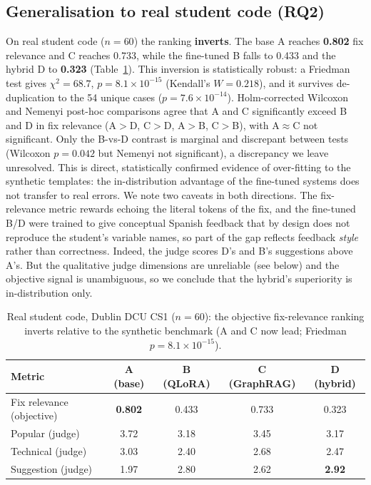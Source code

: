 \documentclass[sageh]{sagej}
\begin{document}
\subsection{Generalisation to real student code (RQ2)}
On real student code ($n=60$) the ranking \textbf{inverts}. The base A reaches \textbf{0.802} fix relevance and C reaches 0.733, while the fine-tuned B falls to 0.433 and the hybrid D to \textbf{0.323} (Table~\ref{tab:dublin}). This inversion is statistically robust: a Friedman test gives $\chi^2=68.7$, $p=8.1\times10^{-15}$ (Kendall's $W=0.218$), and it survives de-duplication to the 54 unique cases ($p=7.6\times10^{-14}$). Holm-corrected Wilcoxon and Nemenyi post-hoc comparisons agree that A and C significantly exceed B and D in fix relevance (A$>$D, C$>$D, A$>$B, C$>$B), with A$\approx$C not significant. Only the B-vs-D contrast is marginal and discrepant between tests (Wilcoxon $p=0.042$ but Nemenyi not significant), a discrepancy we leave unresolved. This is direct, statistically confirmed evidence of over-fitting to the synthetic templates: the in-distribution advantage of the fine-tuned systems does not transfer to real errors. We note two caveats in both directions. The fix-relevance metric rewards echoing the literal tokens of the fix, and the fine-tuned B/D were trained to give conceptual Spanish feedback that by design does not reproduce the student's variable names, so part of the gap reflects feedback \emph{style} rather than correctness. Indeed, the judge scores D's and B's suggestions above A's. But the qualitative judge dimensions are unreliable (see below) and the objective signal is unambiguous, so we conclude that the hybrid's superiority is in-distribution only.

\begin{table}[t]
\centering
\caption{Real student code, Dublin DCU CS1 ($n=60$): the objective fix-relevance ranking inverts relative to the synthetic benchmark (A and C now lead; Friedman $p=8.1\times10^{-15}$).\label{tab:dublin}}
\begin{tabular}{@{}lcccc@{}}
\toprule
Metric & A (base) & B (QLoRA) & C (GraphRAG) & D (hybrid) \\
\midrule
Fix relevance (objective) & \textbf{0.802} & 0.433 & 0.733 & 0.323 \\
Popular (judge)           & 3.72 & 3.18 & 3.45 & 3.17 \\
Technical (judge)         & 3.03 & 2.40 & 2.68 & 2.47 \\
Suggestion (judge)        & 1.97 & 2.80 & 2.62 & \textbf{2.92} \\
\bottomrule
\end{tabular}
\end{table}
\end{document}

